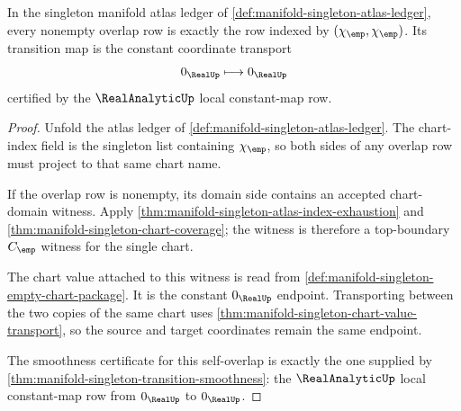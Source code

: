 \begin{theorem}
\label{thm:manifold-singleton-overlap-row-uniqueness}
In the singleton manifold atlas ledger of
\autoref{def:manifold-singleton-atlas-ledger}, every nonempty overlap row is
exactly the row indexed by $(\chi_{\emp},\chi_{\emp})$. Its transition map is
the constant coordinate transport
$$
0_{\RealUp}\longmapsto 0_{\RealUp}
$$
certified by the $\RealAnalyticUp$ local constant-map row.
\end{theorem}
\begin{proof}
Unfold the atlas ledger of
\autoref{def:manifold-singleton-atlas-ledger}. The chart-index field is the
singleton list containing $\chi_{\emp}$, so both sides of any overlap row must
project to that same chart name.

If the overlap row is nonempty, its domain side contains an accepted
chart-domain witness. Apply
\autoref{thm:manifold-singleton-atlas-index-exhaustion} and
\autoref{thm:manifold-singleton-chart-coverage}; the witness is therefore a
top-boundary $C_{\emp}$ witness for the single chart.

The chart value attached to this witness is read from
\autoref{def:manifold-singleton-empty-chart-package}. It is the constant
$0_{\RealUp}$ endpoint. Transporting between the two copies of the same chart
uses \autoref{thm:manifold-singleton-chart-value-transport}, so the source and
target coordinates remain the same endpoint.

The smoothness certificate for this self-overlap is exactly the one supplied
by \autoref{thm:manifold-singleton-transition-smoothness}: the
$\RealAnalyticUp$ local constant-map row from $0_{\RealUp}$ to $0_{\RealUp}$.
\end{proof}

